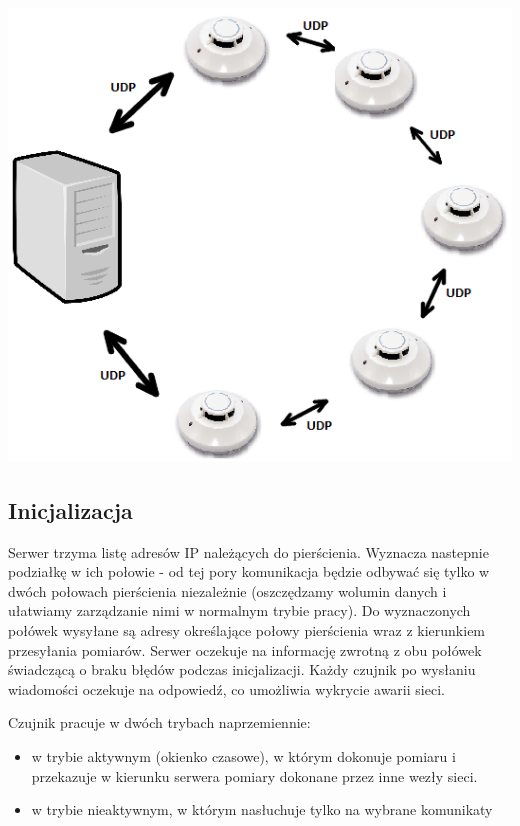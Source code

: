\documentclass[a4paper,11pt]{article}
\begin{document}
\begin{center}
\includegraphics[scale=0.5]{architektura}
\end{center}

\subsection{Inicjalizacja}
Serwer trzyma listę adresów IP należących do pierścienia.
Wyznacza nastepnie podziałkę w ich połowie - od tej pory komunikacja będzie odbywać się tylko w dwóch
połowach pierścienia niezależnie (oszczędzamy wolumin danych i ułatwiamy zarządzanie nimi w normalnym trybie pracy).
Do wyznaczonych połówek wysyłane są adresy określające połowy pierścienia wraz z kierunkiem
przesyłania pomiarów. Serwer oczekuje na informację zwrotną z obu połówek świadczącą o braku
błędów podczas inicjalizacji. Każdy czujnik po wysłaniu wiadomości oczekuje na odpowiedź,
co umożliwia wykrycie awarii sieci.

\newpage
Czujnik pracuje w dwóch trybach naprzemiennie:
\begin{itemize}
\item w trybie aktywnym (okienko czasowe), 
	  w którym dokonuje pomiaru i przekazuje w kierunku serwera pomiary dokonane      przez inne wezły sieci.
\item w trybie nieaktywnym, w którym nasłuchuje tylko na wybrane komunikaty
\end{itemize}
\end{document}

